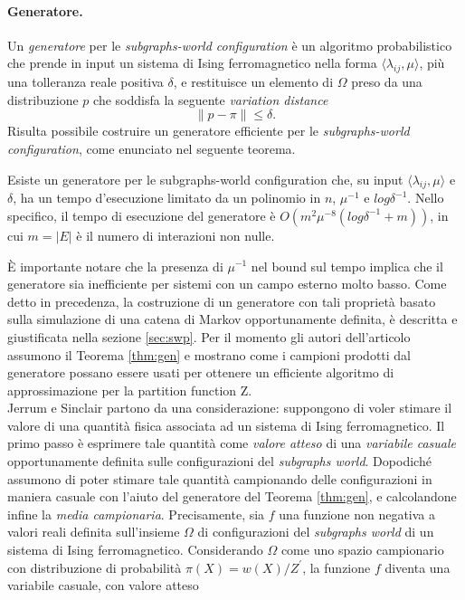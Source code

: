 \paragraph{Generatore.} Un \textit{generatore} per le \textit{subgraphs-world configuration} è un algoritmo probabilistico che prende in input un sistema di Ising ferromagnetico nella forma $\langle\lambda_{ij}, \mu\rangle$, più una tolleranza reale positiva $\delta$, e restituisce un elemento di $\Omega$ preso da una distribuzione $p$ che soddisfa la seguente \textit{variation distance}
\begin{equation}
	\label{vardist}
	\|p-\pi\| \leq \delta.
\end{equation}
Risulta possibile costruire un generatore efficiente per le \textit{subgraphs-world configuration}, come enunciato nel seguente teorema.
\begin{thm}
	Esiste un generatore per le subgraphs-world configuration che, su input $\langle \lambda_{ij}, \mu\rangle$ e $\delta$, ha un tempo d'esecuzione limitato da un polinomio in $n$, $\mu^{-1}$ e $log\delta^{-1}$. Nello specifico, il tempo di esecuzione del generatore è $O(m^2\mu^{-8}(log\delta^{-1} + m))$, in cui $m = |E|$ è il numero di interazioni non nulle.
	\label{thm:gen}
\end{thm}
È importante notare che la presenza di $\mu^{-1}$ nel bound sul tempo implica che il generatore sia inefficiente per sistemi con un campo esterno molto basso. Come detto in precedenza, la costruzione di un generatore con tali proprietà basato sulla simulazione di una catena di Markov opportunamente definita, è descritta e giustificata nella sezione \ref{sec:swp}. Per il momento gli autori dell'articolo assumono il Teorema \ref{thm:gen} e mostrano come i campioni prodotti dal generatore possano essere usati per ottenere un efficiente algoritmo di approssimazione per la partition function Z.\\
Jerrum e Sinclair partono da una considerazione: suppongono di voler stimare il valore di una quantità fisica associata ad un sistema di Ising ferromagnetico. Il primo passo è esprimere tale quantità come \textit{valore atteso} di una \textit{variabile casuale} opportunamente definita sulle configurazioni del \textit{subgraphs world}. Dopodiché assumono di poter stimare tale quantità campionando delle configurazioni in maniera casuale con l'aiuto del generatore del Teorema \ref{thm:gen}, e calcolandone infine la \textit{media campionaria}.
Precisamente, sia $f$ una funzione non negativa a valori reali definita sull'insieme $\Omega$ di configurazioni del \textit{subgraphs world} di un sistema di Ising ferromagnetico. Considerando $\Omega$ come uno spazio campionario con distribuzione di probabilità $\pi(X) = w(X)/Z^{\prime}$, la funzione $f$ diventa una variabile casuale, con valore atteso
